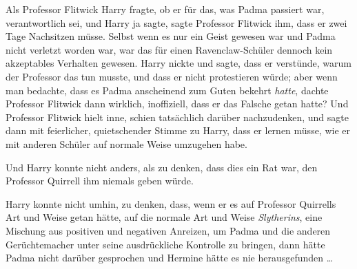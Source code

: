 Als Professor Flitwick Harry fragte, ob er für das, was Padma passiert war, verantwortlich sei, und Harry ja sagte, sagte Professor Flitwick ihm, dass er zwei Tage Nachsitzen müsse. Selbst wenn es nur ein Geist gewesen war und Padma nicht verletzt worden war, war das für einen Ravenclaw-Schüler dennoch kein akzeptables Verhalten gewesen. Harry nickte und sagte, dass er verstünde, warum der Professor das tun musste, und dass er nicht protestieren würde; aber wenn man bedachte, dass es Padma anscheinend zum Guten bekehrt \emph{hatte}, dachte Professor Flitwick dann wirklich, inoffiziell, dass er das Falsche getan hatte? Und Professor Flitwick hielt inne, schien tatsächlich darüber nachzudenken, und sagte dann mit feierlicher, quietschender Stimme zu Harry, dass er lernen müsse, wie er mit anderen Schüler auf normale Weise umzugehen habe.

Und Harry konnte nicht anders, als zu denken, dass dies ein Rat war, den Professor Quirrell ihm niemals geben würde.

Harry konnte nicht umhin, zu denken, dass, wenn er es auf Professor Quirrells Art und Weise getan hätte, auf die normale Art und Weise \emph{Slytherins}, eine Mischung aus positiven und negativen Anreizen, um Padma und die anderen Gerüchtemacher unter seine ausdrückliche Kontrolle zu bringen, dann hätte Padma nicht darüber gesprochen und Hermine hätte es nie herausgefunden …

